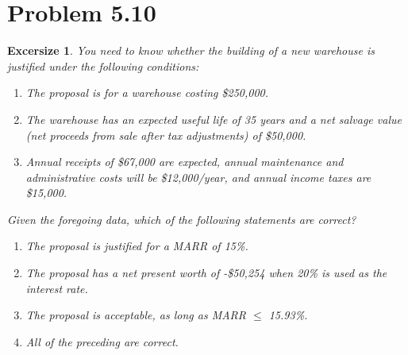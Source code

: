 \documentclass[../INDE250HW.tex]{subfiles}
\newtheorem{exrc}{Excersize}
\begin{document}
\section*{Problem 5.10}
\begin{exrc}
    You need to know whether the building of a new warehouse is justified under the following conditions:
    \begin{enumerate}
        \item The proposal is for a warehouse costing \$250,000.
        \item The warehouse has an expected useful life of 35 years and a net salvage value (net proceeds from sale after tax adjustments) of \$50,000.
        \item Annual receipts of \$67,000 are expected, annual maintenance and administrative costs will be \$12,000/year, and annual income taxes are \$15,000.
    \end{enumerate}
    Given the foregoing data, which of the following statements are correct?
    \begin{enumerate}
        \item The proposal is justified for a MARR of 15\%.
        \item The proposal has a net present worth of -\$50,254 when 20\% is used as the interest rate.
        \item The proposal is acceptable, as long as MARR $\leq$ 15.93\%.
        \item All of the preceding are correct.
    \end{enumerate}
\end{exrc}
\end{document}
